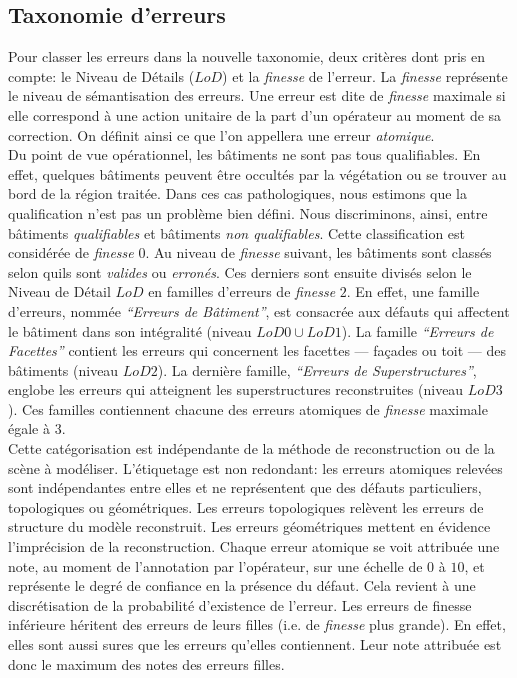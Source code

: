 \documentclass[a4paper,french]{article}
\begin{document}
    \subsection{Taxonomie d'erreurs}

    Pour classer les erreurs dans la nouvelle taxonomie, deux critères dont pris en compte: le Niveau de Détails ($LoD$) et la \emph{finesse} de l'erreur. La \emph{finesse} représente le niveau de sémantisation des erreurs. Une erreur est dite de \emph{finesse} maximale si elle correspond à une action unitaire de la part d'un opérateur au moment de sa correction. On définit ainsi ce que l'on appellera une erreur \emph{atomique}.\\
    Du point de vue opérationnel, les bâtiments ne sont pas tous qualifiables. En effet, quelques bâtiments peuvent être occultés par la végétation ou se trouver au bord de la région traitée. Dans ces cas pathologiques, nous estimons que la qualification n'est pas un problème bien défini. Nous discriminons, ainsi, entre bâtiments \emph{qualifiables} et bâtiments \emph{non qualifiables}. Cette classification est considérée de \emph{finesse} $0$. Au niveau de \emph{finesse} suivant, les bâtiments sont classés selon quils sont \emph{valides} ou \emph{erronés}. Ces derniers sont ensuite divisés selon le Niveau de Détail $LoD$ en familles d'erreurs de \emph{finesse} $2$. En effet, une famille d'erreurs, nommée \emph{``Erreurs de Bâtiment''}, est consacrée aux défauts qui affectent le bâtiment dans son intégralité (niveau $LoD 0\cup LoD 1$). La famille \emph{``Erreurs de Facettes''} contient les erreurs qui concernent les facettes --- façades ou toit --- des bâtiments (niveau $LoD 2$). La dernière famille, \emph{``Erreurs de Superstructures''}, englobe les erreurs qui atteignent les superstructures reconstruites (niveau $LoD 3$). Ces familles contiennent chacune des erreurs atomiques de \emph{finesse} maximale égale à $3$.\\
    Cette catégorisation est indépendante de la méthode de reconstruction ou de la scène à modéliser. L'étiquetage est non redondant: les erreurs atomiques relevées sont indépendantes entre elles et ne représentent que des défauts particuliers, topologiques ou géométriques. Les erreurs topologiques relèvent les erreurs de structure du modèle reconstruit. Les erreurs géométriques mettent en évidence l'imprécision de la reconstruction. Chaque erreur atomique se voit attribuée une note, au moment de l'annotation par l'opérateur, sur une échelle de $0$ à $10$, et représente le degré de confiance en la présence du défaut. Cela revient à une discrétisation de la probabilité d'existence de l'erreur. Les erreurs de finesse inférieure héritent des erreurs de leurs filles (i.e. de \emph{finesse} plus grande). En effet, elles sont aussi sures que les erreurs qu'elles contiennent. Leur note attribuée est donc le maximum des notes des erreurs filles.
\end{document}
